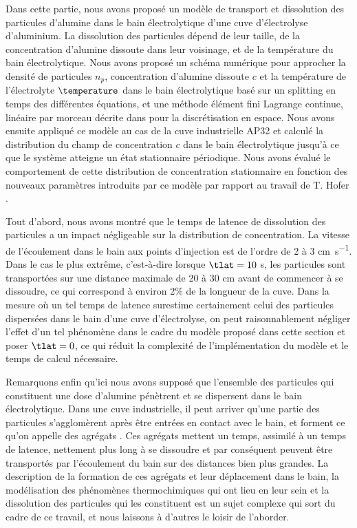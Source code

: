 Dans cette partie, nous avons proposé un modèle de transport et
dissolution des particules d'alumine dans le bain électrolytique d'une
cuve d'électrolyse d'aluminium. La dissolution des particules dépend
de leur taille, de la concentration d'alumine dissoute dans leur
voisinage, et de la température du bain électrolytique. Nous avons
proposé un schéma numérique pour approcher la densité de particules
$n_p$, concentration d'alumine dissoute $c$ et la température de
l'électrolyte $\temperature$ dans le bain électrolytique basé sur un
splitting en temps des différentes équations, et une méthode élément
fini Lagrange continue, linéaire par morceau décrite dans
\cite{Hofer2011} pour la discrétisation en espace. Nous avons ensuite
appliqué ce modèle au cas de la cuve industrielle AP32 et calculé la
distribution du champ de concentration $c$ dans le bain électrolytique
jusqu'à ce que le système atteigne un état stationnaire
périodique. Nous avons évalué le comportement de cette distribution de
concentration stationnaire en fonction des nouveaux paramètres
introduits par ce modèle par rapport au travail de T. Hofer
\cite{Hofer2011}.

Tout d'abord, nous avons montré que le temps de latence de dissolution
des particules a un impact négligeable sur la distribution de
concentration. La vitesse de l'écoulement dans le bain aux points
d'injection est de l'ordre de 2 à 3 \si{\centi\meter\per\second}. Dans
le cas le plus extrême, c'est-à-dire lorsque $\tlat = 10$
\si{\second}, les particules sont transportées sur une distance
maximale de 20 à 30 \si{\centi\meter} avant de commencer à se
dissoudre, ce qui correspond à environ 2\% de la longueur de la
cuve. Dans la mesure où un tel temps de latence surestime certainement
celui des particules dispersées dans le bain d'une cuve d'électrolyse,
on peut raisonnablement négliger l'effet d'un tel phénomène dans le
cadre du modèle proposé dans cette section et poser $\tlat = 0$, ce
qui réduit la complexité de l'implémentation du modèle et le temps de
calcul nécessaire.

Remarquons enfin qu'ici nous avons supposé que l'ensemble des
particules qui constituent une dose d'alumine pénètrent et se
dispersent dans le bain électrolytique. Dans une cuve industrielle, il
peut arriver qu'une partie des particules s'agglomèrent après être
entrées en contact avec le bain, et forment ce qu'on appelle des agrégats
\cite{Dassylva2015}. Ces agrégats mettent un temps, assimilé à un
temps de latence, nettement plus long à se dissoudre et par conséquent
peuvent être transportés par l'écoulement du bain sur des distances bien
plus grandes. La description de la formation de ces agrégats et leur
déplacement dans le bain, la modélisation des phénomènes
thermochimiques qui ont lieu en leur sein et la dissolution des
particules qui les constituent est un sujet complexe qui sort du cadre
de ce travail, et nous laissons à d'autres le loisir de l'aborder.

